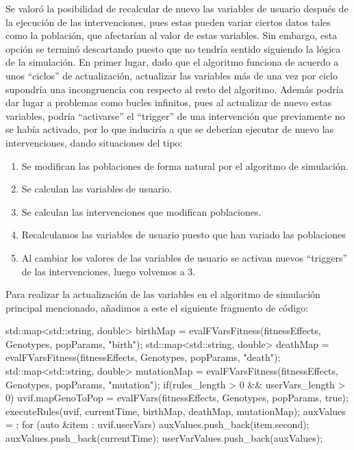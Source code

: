 Se valoró la posibilidad de recalcular de nuevo las variables de usuario  después de la ejecución de las intervenciones, pues estas pueden variar ciertos datos tales como la población, que afectarían al valor de estas variables. Sin embargo, esta opción se terminó descartando puesto que no tendría sentido siguiendo la lógica de la simulación. En primer lugar, dado que el algoritmo funciona de acuerdo a unos ``ciclos'' de actualización, actualizar las variables más de una vez por ciclo supondría una incongruencia con respecto al resto del algoritmo. Además podría dar lugar a problemas como bucles infinitos, pues al actualizar de nuevo estas variables, podría ``activarse'' el ``trigger'' de una intervención que previamente no se había activado, por lo que induciría a que se deberían ejecutar de nuevo las intervenciones, dando situaciones del tipo:
\begin{enumerate}
	\item Se modifican las poblaciones de forma natural por el algoritmo de simulación.
	\item Se calculan las variables de usuario.
	\item Se calculan las intervenciones que modifican poblaciones.
	\item Recalculamos las variables de usuario puesto que han variado las poblaciones
	\item Al cambiar los valores de las variables de usuario se activan nuevos ``triggers'' de las intervenciones, luego volvemos a 3.
\end{enumerate}  

Para realizar la actualización de las variables en el algoritmo de simulación principal mencionado, añadimos a este el siguiente fragmento de código:

\begin{CPP}
      std::map<std::string, double> birthMap = evalFVarsFitness(fitnessEffects, Genotypes, popParams, "birth");
      std::map<std::string, double> deathMap = evalFVarsFitness(fitnessEffects, Genotypes, popParams, "death");
      std::map<std::string, double> mutationMap = evalFVarsFitness(fitnessEffects, Genotypes, popParams, "mutation");
      if(rules_length > 0 && userVars_length > 0){
        uvif.mapGenoToPop = evalFVars(fitnessEffects, Genotypes, popParams, true);
        executeRules(uvif, currentTime, birthMap, deathMap, mutationMap);
        auxValues = {};
        for (auto &item : uvif.userVars){
          auxValues.push_back(item.second);
        }
        auxValues.push_back(currentTime);
        userVarValues.push_back(auxValues);
      } 
\end{CPP}

